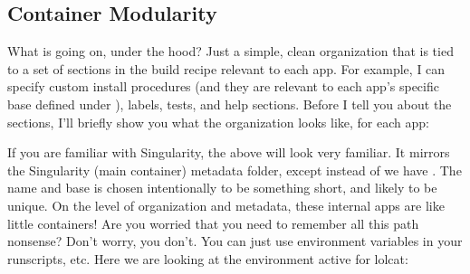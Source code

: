 \documentclass[letterpaper,10pt,english]{sphinxmanual}
\begin{document}
\subsection{Container Modularity}
\label{\detokenize{reproducible_scif_apps:container-modularity}}
What is going on, under the hood? Just a simple, clean organization that
is tied to a set of sections in the build recipe relevant to each app.
For example, I can specify custom install procedures (and they are
relevant to each app’s specific base defined under ), labels, tests, and
help sections. Before I tell you about the sections, I’ll briefly show
you what the organization looks like, for each app:

%
\begin{sphinxVerbatim}[commandchars=\\\{\}]













\end{sphinxVerbatim}

If you are familiar with Singularity, the above will look very familiar.
It mirrors the Singularity (main container) metadata folder, except
instead of  we have . The name and base  is chosen intentionally to be
something short, and likely to be unique. On the level of organization
and metadata, these internal apps are like little containers! Are you
worried that you need to remember all this path nonsense? Don’t worry,
you don’t. You can just use environment variables in your runscripts,
etc. Here we are looking at the environment active for lolcat:
\end{document}
